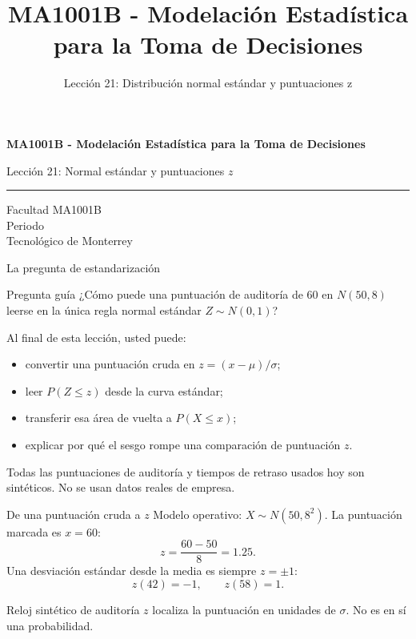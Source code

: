 \documentclass[aspectratio=169,10pt,spanish]{beamer}
\title{MA1001B - Modelación Estadística para la Toma de Decisiones}
\subtitle{Lección 21: Distribución normal estándar y puntuaciones z}
\author{}
\institute{Tecnol\'ogico de Monterrey}
\date{}
\begin{document}
\begin{frame}[plain]
  \vspace{1.2cm}
  {\Large\bfseries MA1001B - Modelación Estadística para la Toma de Decisiones\par}
  \vspace{0.7cm}
  {\large Lección 21: Normal estándar y puntuaciones $z$\par}
  \vspace{0.7cm}
  {\color{TecRojo}\rule{\textwidth}{1.2pt}}
  \vspace{0.8cm}

  Facultad MA1001B\\[0.3cm]
  Periodo\\[0.3cm]
  Tecnol\'ogico de Monterrey
\end{frame}

\begin{frame}{La pregunta de estandarización}
  \begin{alertblock}{Pregunta guía}
    ¿Cómo puede una puntuación de auditoría de 60 en $N(50,8)$ leerse en la
    única regla normal estándar $Z\sim N(0,1)$?
  \end{alertblock}

  \vspace{0.6em}
  Al final de esta lección, usted puede:
  \begin{itemize}
    \item convertir una puntuación cruda en $z=(x-\mu)/\sigma$;
    \item leer $P(Z\le z)$ desde la curva estándar;
    \item transferir esa área de vuelta a $P(X\le x)$;
    \item explicar por qué el sesgo rompe una comparación de puntuación $z$.
  \end{itemize}

  \vfill
  \scriptsize Todas las puntuaciones de auditoría y tiempos de retraso usados hoy son sintéticos. No se usan datos reales de empresa.
\end{frame}

\begin{frame}{De una puntuación cruda a $z$}
  \small
  Modelo operativo: $X\sim N(50,8^2)$. La puntuación marcada es $x=60$:
  \[
    z=\frac{60-50}{8}=1.25.
  \]
  Una desviación estándar desde la media es siempre $z=\pm 1$:
  \[
    z(42)=-1,\qquad z(58)=1.
  \]

  \vspace{0.3em}
  \begin{exampleblock}{Reloj sintético de auditoría}
    $z$ localiza la puntuación en unidades de $\sigma$. No es en sí una
    probabilidad.
  \end{exampleblock}
\end{frame}
\end{document}
